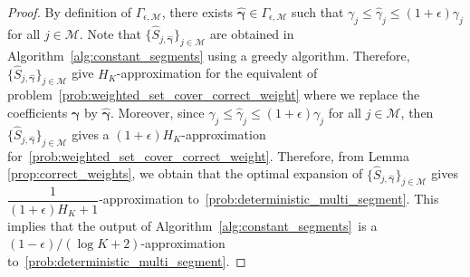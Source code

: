 \documentclass[msom,non-blindrev]{informs3} %
\theoremstyle{definition}
\begin{document}
\begin{proof}

By definition of $\Gamma_{\epsilon,\mathcal{M}}$, there exists  $\hat{\boldsymbol{\gamma}}\in\Gamma_{\epsilon,\mathcal{M}}$ such that $\gamma_j\leq\hat{\gamma}_j\leq (1+\epsilon)\gamma_j$ for all $j\in\mathcal{M}$. Note that $\{\hat{S}_{j,\hat{\boldsymbol{\gamma}}}\}_{j\in\mathcal{M}}$ are obtained in Algorithm~\ref{alg:constant_segments} using a greedy algorithm. Therefore,  $\{\hat{S}_{j,\hat{\boldsymbol{\gamma}}}\}_{j\in\mathcal{M}}$ give $H_K$-approximation for the equivalent of problem~\eqref{prob:weighted_set_cover_correct_weight} where we replace the coefficients   ${\boldsymbol{\gamma}}$ by $\hat{\boldsymbol{\gamma}}$.
Moreover, since $\gamma_j \leq \hat{\gamma}_j \leq (1+\epsilon){\gamma}_j$ for all $j\in\mathcal{M}$, then $\{\hat{S}_{j,\hat{\boldsymbol{\gamma}}}\}_{j\in\mathcal{M}}$ gives a $(1+\epsilon)H_K$-approximation for~\eqref{prob:weighted_set_cover_correct_weight}. 
Therefore, from Lemma \ref{prop:correct_weights}, we obtain that the optimal expansion of  $\{\hat{S}_{j,\hat{\boldsymbol{\gamma}}}\}_{j\in\mathcal{M}}$ gives $ \dfrac{1}{(1+\epsilon)H_K+1}$-approximation to~\eqref{prob:deterministic_multi_segment}.
This implies that the output of Algorithm~\ref{alg:constant_segments}~is a $(1-\epsilon)/(\log K+2)$-approximation to~\eqref{prob:deterministic_multi_segment}.


\end{proof}
\end{document}
